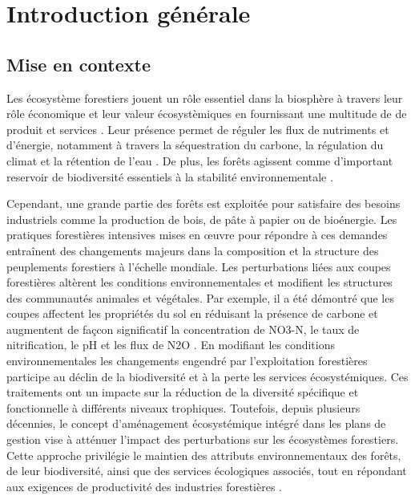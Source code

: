 \chapter*{Introduction générale}         %
\label{chap-introduction}       %


\section*{Mise en contexte}
\label{sec:contexte}


Les écosystème forestiers jouent un rôle essentiel dans la biosphère à travers leur rôle économique et leur valeur écosystèmiques en fournissant une multitude de de produit et services \citep{Balvanera2006Quantifyingevidence}. 
Leur présence permet de réguler les flux de nutriments et d'énergie, notamment à travers la séquestration du carbone, la régulation du climat et la rétention de l'eau \citep{Balvanera2006Quantifyingevidence,Canadell2008Managingforests,Pawson2013Plantationforests}. 
De plus, les forêts agissent comme d'important reservoir de biodiversité essentiels à la stabilité environnementale \citep{Diaz2006BiodiversityLoss}. 


Cependant, une grande partie des forêts est exploitée pour satisfaire des besoins industriels comme la production de bois, de pâte à papier ou de bioénergie. 
Les pratiques forestières intensives mises en œuvre pour répondre à ces demandes entraînent des changements majeurs dans la composition et la structure des peuplements forestiers à l’échelle mondiale. 
Les perturbations liées aux coupes forestières altèrent les conditions environnementales et modifient les structures des communautés animales et végétales.
Par exemple, il a été démontré que les coupes affectent les propriétés du sol en réduisant la présence de carbone et augmentent de façcon significatif la concentration de NO3-N, le taux de nitrification, le pH et les flux de N2O \citep{Jerabkova2011metaanalysiseffects,Michal2014Responsessmall,James2016effectharvest,Zhang2022Intensiveforest}. 
En modifiant les conditions environnementales les changements engendré par l'exploitation forestières participe au déclin de la biodiversité et à la perte les services écosystémiques.
Ces traitements ont un impacte sur la réduction de la diversité spécifique et fonctionnelle à différents niveaux trophiques.
Toutefois, depuis plusieurs décennies, le concept d'aménagement écosystémique intégré dans les plans de gestion vise à atténuer l'impact des perturbations sur les écosystèmes forestiers. 
Cette approche privilégie le maintien des attributs environnementaux des forêts, de leur biodiversité, ainsi que des services écologiques associés, tout en répondant aux exigences de productivité des industries forestières \citep{Perry1998scientificbasis,Szaro1998emergenceecosystem,Kuuluvainen2009Forestmanagement,MacDicken2015Globalprogress}.


